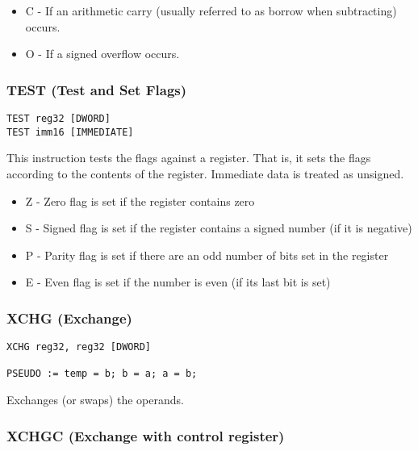 
\begin{itemize}
        \item C - If an arithmetic carry (usually referred to as borrow when subtracting) occurs.
        \item O - If a signed overflow occurs.
\end{itemize}

\subsubsection{TEST (Test and Set Flags)}

\begin{verbatim}
TEST reg32 [DWORD]
TEST imm16 [IMMEDIATE]
\end{verbatim}


This instruction tests the flags against a register. That is, it sets the flags according to the contents of the register. Immediate data is treated as unsigned. 


\begin{itemize}
        \item Z - Zero flag is set if the register contains zero
        \item S - Signed flag is set if the register contains a signed number (if it is negative)
        \item P - Parity flag is set if there are an odd number of bits set in the register
        \item E - Even flag is set if the number is even (if its last bit is set)
\end{itemize}

\subsubsection{XCHG (Exchange)}

\begin{verbatim}
XCHG reg32, reg32 [DWORD]

PSEUDO := temp = b; b = a; a = b;
\end{verbatim}


Exchanges (or swaps) the operands.

\subsubsection{XCHGC (Exchange with control register)}

